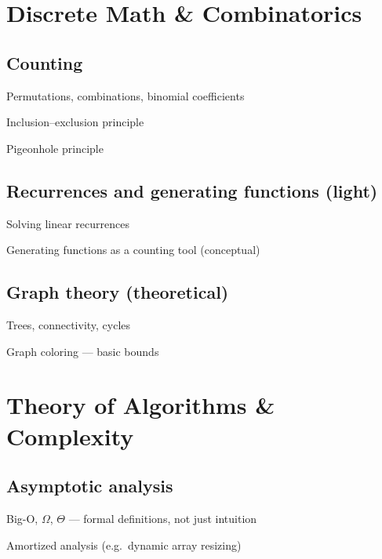 \documentclass[11pt]{article}
\begin{document}
\section{Discrete Math \& Combinatorics}

\subsection{Counting}
\begin{tasklist}
    \item Permutations, combinations, binomial coefficients
    \item Inclusion--exclusion principle
    \item Pigeonhole principle
\end{tasklist}

\subsection{Recurrences and generating functions (light)}
\begin{tasklist}
    \item Solving linear recurrences
    \item Generating functions as a counting tool (conceptual)
\end{tasklist}

\subsection{Graph theory (theoretical)}
\begin{tasklist}
    \item Trees, connectivity, cycles
    \item Graph coloring — basic bounds
\end{tasklist}

\section{Theory of Algorithms \& Complexity}

\subsection{Asymptotic analysis}
\begin{tasklist}
    \item Big-O, $\Omega$, $\Theta$ — formal definitions, not just intuition
    \item Amortized analysis (e.g.\ dynamic array resizing)
\end{tasklist}
\end{document}
